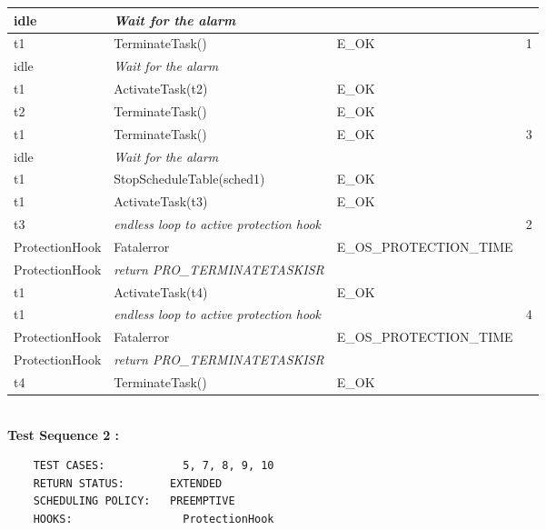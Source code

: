 \documentclass[10pt]{article}
\newlength{\Li}\settowidth{\Li}{Running}
\newlength{\Lii}\setlength{\Lii}{7cm}
\newlength{\Liiii}\setlength{\Liiii}{0.9cm}
\newlength{\Liii}\setlength{\Liii}{\textwidth} \addtolength{\Liii}{-\Li} \addtolength{\Liii}{-\Lii} \addtolength{\Liii}{-\Liiii}
\begin{document}
	\begin{supertabular}{|p{\Li}|p{\Lii}|p{\Liii}|p{\Liiii}|} \hline 
	idle	& \textit{Wait for the alarm}							& 										& \\ \hline
	t1	& TerminateTask()							& E\_OK											& 1 \\ \hline
	idle	& \textit{Wait for the alarm}							& 										& \\ \hline
	t1	& ActivateTask(t2)							& E\_OK											& \\ \hline
	t2	& TerminateTask()							& E\_OK											& \\ \hline
	t1	& TerminateTask()							& E\_OK											& 3 \\ \hline
	idle	& \textit{Wait for the alarm}							& 										& \\ \hline
	t1	& StopScheduleTable(sched1)					& E\_OK											& \\ \hline
	t1	& ActivateTask(t3)							& E\_OK											& \\ \hline
	t3	& \textit{endless loop to active protection hook}		& 												& 2 \\ \hline
	ProtectionHook		& Fatalerror					& E\_OS\_PROTECTION\_TIME 						& \\ \hline
	ProtectionHook		& \textit{return PRO\_TERMINATETASKISR}	& & \\ \hline
	t1	& ActivateTask(t4)							& E\_OK											& \\ \hline
	t1	& \textit{endless loop to active protection hook}		& 												& 4 \\ \hline
	ProtectionHook		& Fatalerror					& E\_OS\_PROTECTION\_TIME 						& \\ \hline
	ProtectionHook		& \textit{return PRO\_TERMINATETASKISR}	& & \\ \hline
	t4	& TerminateTask()							& E\_OK											& \\ \hline
	\end{supertabular}\\

	\textbf{Test Sequence 2 :}
	\begin{lstlisting}
	TEST CASES:		       5, 7, 8, 9, 10
	RETURN STATUS:	  	 EXTENDED
	SCHEDULING POLICY:   PREEMPTIVE
	HOOKS:		           ProtectionHook
	\end{lstlisting}
	
\end{document}
